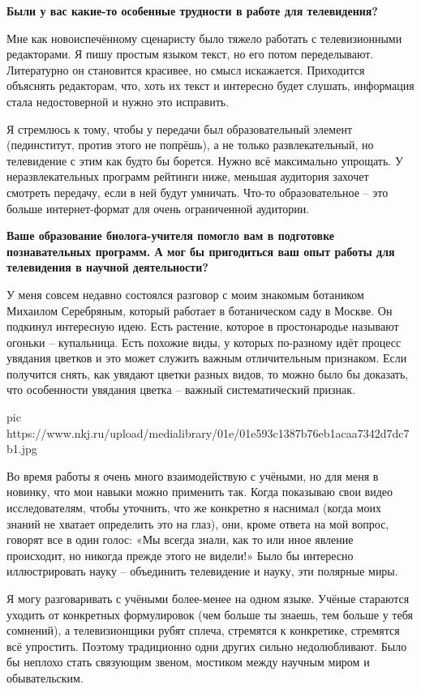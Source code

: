 \textbf{Были у вас какие-то особенные трудности в работе для телевидения?}

Мне как новоиспечённому сценаристу было тяжело работать с телевизионными
редакторами. Я пишу простым языком текст, но его потом переделывают.
Литературно он становится красивее, но смысл искажается. Приходится объяснять
редакторам, что, хоть их текст и интересно будет слушать, информация стала
недостоверной и нужно это исправить.

Я стремлюсь к тому, чтобы у передачи был образовательный элемент (пединститут,
против этого не попрёшь), а не только развлекательный, но телевидение с этим
как будто бы борется. Нужно всё максимально упрощать. У неразвлекательных
программ рейтинги ниже, меньшая аудитория захочет смотреть передачу, если в ней
будут умничать. Что-то образовательное – это больше интернет-формат для очень
ограниченной аудитории. 

\textbf{Ваше образование биолога-учителя помогло вам в подготовке познавательных
программ. А мог бы пригодиться ваш опыт работы для телевидения в научной
деятельности?}

У меня совсем недавно состоялся разговор с моим знакомым ботаником Михаилом
Серебряным, который работает в ботаническом саду в Москве. Он подкинул
интересную идею. Есть растение, которое в простонародье называют огоньки –
купальница. Есть похожие виды, у которых по-разному идёт процесс увядания
цветков и это может служить важным отличительным признаком. Если получится
снять, как увядают цветки разных видов, то можно было бы доказать, что
особенности увядания цветка – важный систематический признак. 

\ifcmt
pic https://www.nkj.ru/upload/medialibrary/01e/01e593c1387b76eb1acaa7342d7dc7b1.jpg
\fi

Во время работы я очень много взаимодействую с учёными, но для меня в новинку,
что мои навыки можно применить так. Когда показываю свои видео исследователям,
чтобы уточнить, что же конкретно я наснимал (когда моих знаний не хватает
определить это на глаз), они, кроме ответа на мой вопрос, говорят все в один
голос: «Мы всегда знали, как то или иное явление происходит, но никогда прежде
этого не видели!» Было бы интересно иллюстрировать науку – объединить
телевидение и науку, эти полярные миры.

Я могу разговаривать с учёными более-менее на одном языке. Учёные стараются
уходить от конкретных формулировок (чем больше ты знаешь, тем больше у тебя
сомнений), а телевизионщики рубят сплеча, стремятся к конкретике, стремятся всё
упростить. Поэтому традиционно одни других сильно недолюбливают. Было бы
неплохо стать связующим звеном, мостиком между научным миром и обывательским. 

